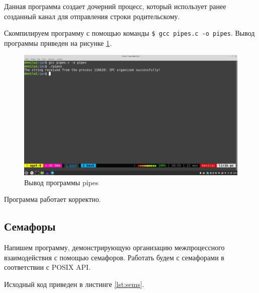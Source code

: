 \documentclass[a4paper,14pt]{extarticle}
\begin{document}
Данная программа создает дочерний процесс, который использует ранее созданный канал для отправления строки родительскому.

Скомпилируем программу с помощью команды \texttt{\$ gcc pipes.c -o pipes}. Вывод программы приведен на рисунке \ref{fig:pipes}.

\begin{figure}[h!]
	\centering
	\includegraphics[width=0.9\linewidth]{images/6/pipes}
	\caption{Вывод программы pipes}
	\label{fig:pipes}
\end{figure}

Программа работает корректно. 

\subsection{Семафоры}

Напишем программу, демонстрирующую организацию межпроцессного взаимодействия с помощью семафоров. Работать будем с семафорами в соответствии с POSIX API. 

Исходный код приведен в листинге \ref{lst:sems}.
\end{document}
